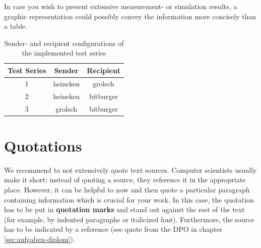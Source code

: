 \begin{quotation}
\end{quotation}

In case you wish to present extensive measurement- or simulation results, a graphic
representation could possibly convey the information more concisely than a table.


\begin{table}
  \renewcommand{\arraystretch}{1.5}
  \begin{center}
    \begin{tabular}{|c|c|c|}
      \hline
      \textbf{Test Series} & \textbf{Sender} & \textbf{Recipient} \\
      \hline
      1 & heineken & grolsch \\
      \hline
      2 & heineken & bitburger  \\
      \hline
      3 & grolsch & bitburger \\
      \hline
    \end{tabular}
    \caption{Sender- and recipient configurations of the implemented test series}
    \label{tab:config}
  \end{center}
\end{table}


\section{Quotations}
\label{sec:quotations}

We recommend to not extensively quote text sources. Computer scientists usually
make it short; instead of quoting a source, they reference it in the appropriate
place. However, it can be helpful to now and then quote a particular paragraph 
containing information which is crucial for your work. In this case, the quotation
has to be put in \textbf{quotation marks} and stand out against the rest of the
text (for example, by indented paragraphs or italicized font). Furthermore, the 
source has to be indicated by a reference (see quote from the DPO in chapter
\ref{sec:aufgaben-diplom}).

